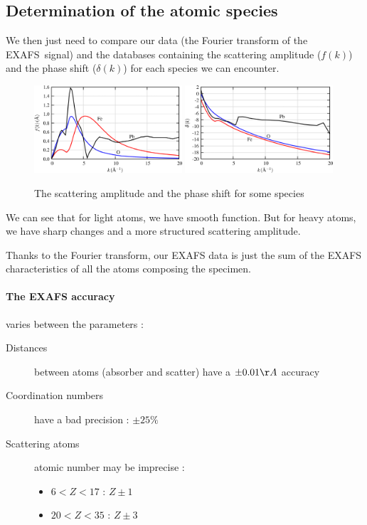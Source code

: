 \documentclass[11pt,a4paper,oneside]{report}
\begin{document}
\subsection{Determination of the atomic species}
We then just need to compare our data (the Fourier transform of the EXAFS signal) and the databases containing the scattering amplitude ($f(k)$) and the phase shift ($\delta(k)$) for each species we can encounter.

\begin{figure}[H]
    \begin{center}
        \includegraphics[width=0.49\textwidth]{Images/Database1}
        \includegraphics[width=0.49\textwidth]{Images/Database2}
        \caption{The scattering amplitude and the phase shift for some species}
        \label{fouriertransform}
    \end{center}
\end{figure}

We can see that for light atoms, we have smooth function. But for heavy atoms, we have sharp changes and a more structured scattering amplitude.

Thanks to the Fourier transform, our EXAFS data is just the sum of the EXAFS characteristics of all the atoms composing the specimen.

\paragraph{The EXAFS accuracy} varies between the parameters : 
\begin{description}
    \item[Distances] between atoms (absorber and scatter) have a $\pm 0.01 \AA$ accuracy
    \item[Coordination numbers] have a bad precision : $\pm 25\%$
    \item[Scattering atoms] atomic number may be imprecise :
    \begin{itemize}
        \item $6<Z<17$ : $Z \pm 1$
        \item $20<Z<35$ : $Z \pm 3$
    \end{itemize}
\end{description}
\end{document}
